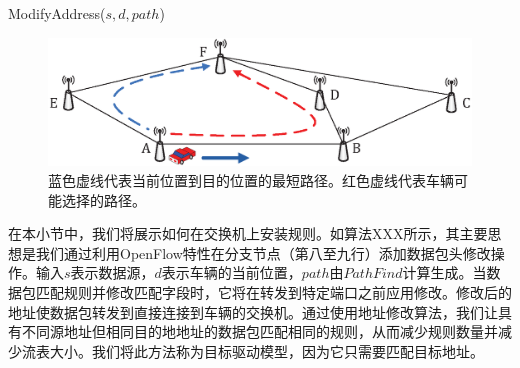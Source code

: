\begin{algorithm}[t]
\caption{ModifyAddress($s,d,path$)}
\label{Algorithm 3}
\begin{algorithmic}[1]

\end{algorithmic}
\vspace{-0.06in}
\end{algorithm}

\vspace{-0.05in}

\begin{figure} [t]
\begin{center}
\includegraphics[width=0.9\columnwidth]{figures/fig-5-31.eps}
\caption{蓝色虚线代表当前位置到目的位置的最短路径。红色虚线代表车辆可能选择的路径。} \label{fig5}
\end{center}
\vspace{-0.3in}
\end{figure}

在本小节中，我们将展示如何在交换机上安装规则。如算法XXX所示，其主要思想是我们通过利用OpenFlow特性在分支节点（第八至九行）添加数据包头修改操作。输入$s$表示数据源，$d$表示车辆的当前位置，$path$由$PathFind$计算生成。当数据包匹配规则并修改匹配字段时，它将在转发到特定端口之前应用修改。修改后的地址使数据包转发到直接连接到车辆的交换机。通过使用地址修改算法，我们让具有不同源地址但相同目的地地址的数据包匹配相同的规则，从而减少规则数量并减少流表大小。我们将此方法称为目标驱动模型，因为它只需要匹配目标地址。

